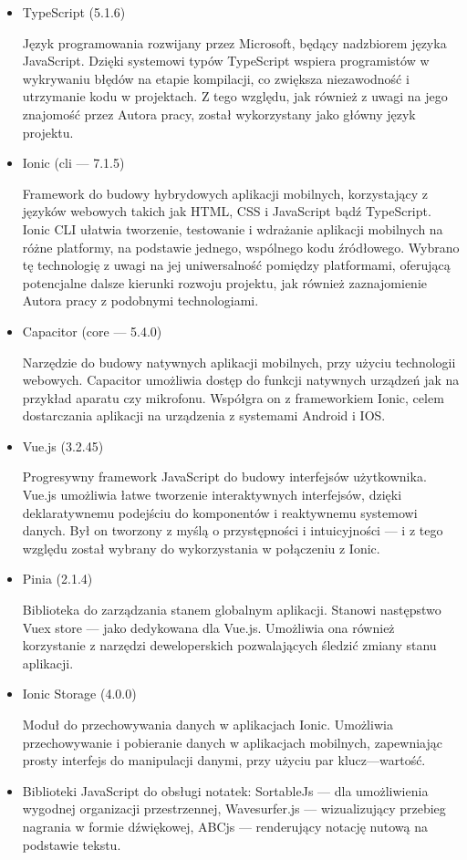 \documentclass[12pt]{article}
\begin{document}
\begin{itemize}
	\item TypeScript (5.1.6)
	      
	      Język programowania rozwijany przez Microsoft, będący nadzbiorem języka JavaScript.
	      Dzięki systemowi typów TypeScript wspiera programistów w wykrywaniu błędów na etapie kompilacji,
	      co zwiększa niezawodność i utrzymanie kodu w projektach. Z tego względu, jak również z uwagi na jego znajomość
	      przez Autora pracy, został wykorzystany jako główny język projektu.
	\item Ionic (cli — 7.1.5)
	      
	      Framework do budowy hybrydowych aplikacji mobilnych, korzystający z języków webowych takich jak HTML,
	      CSS i JavaScript bądź TypeScript.
	      Ionic CLI ułatwia tworzenie, testowanie i wdrażanie aplikacji mobilnych na różne platformy, na podstawie jednego,
	      wspólnego kodu źródłowego.
	      Wybrano tę technologię z uwagi na jej uniwersalność pomiędzy platformami, oferującą potencjalne dalsze kierunki
	      rozwoju projektu, jak również zaznajomienie Autora pracy z podobnymi technologiami.
	\item Capacitor (core — 5.4.0)
	      
	      Narzędzie do budowy natywnych aplikacji mobilnych, przy użyciu technologii webowych.
	      Capacitor umożliwia dostęp do funkcji natywnych urządzeń jak na przykład aparatu czy mikrofonu.
	      Współgra on z frameworkiem Ionic, celem dostarczania aplikacji na urządzenia z systemami Android i IOS.
	\item Vue.js (3.2.45)
	      
	      Progresywny framework JavaScript do budowy interfejsów użytkownika.
	      Vue.js umożliwia łatwe tworzenie interaktywnych interfejsów, dzięki deklaratywnemu podejściu do komponentów i
	      reaktywnemu systemowi danych. Był on tworzony z myślą o przystępności i intuicyjności
	      — i z tego względu został wybrany do wykorzystania w połączeniu z Ionic.
	\item Pinia (2.1.4)
	      
	      Biblioteka do zarządzania stanem globalnym aplikacji. Stanowi następstwo Vuex store — jako dedykowana dla
	      Vue.js. Umożliwia ona również korzystanie z narzędzi deweloperskich pozwalających śledzić zmiany stanu aplikacji.
	\item Ionic Storage (4.0.0)
	      
	      Moduł do przechowywania danych w aplikacjach Ionic. Umożliwia przechowywanie i pobieranie danych
	      w aplikacjach mobilnych, zapewniając prosty interfejs do manipulacji danymi, przy użyciu par klucz—wartość.
	\item Biblioteki JavaScript do obsługi notatek:
	      \subitem SortableJs — dla umożliwienia wygodnej organizacji przestrzennej,
	      \subitem Wavesurfer.js — wizualizujący przebieg nagrania w formie dźwiękowej,
	      \subitem ABCjs — renderujący notację nutową na podstawie tekstu.
	      

\end{itemize}
\end{document}
